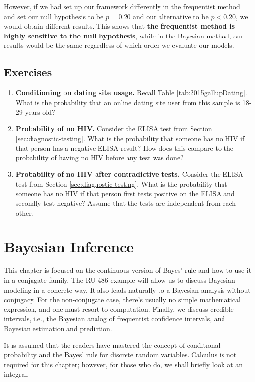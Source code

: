\documentclass[]{book}
\theoremstyle{definition}
\theoremstyle{definition}
\theoremstyle{definition}
\theoremstyle{remark}
\begin{document}
However, if we had set up our framework differently in the frequentist
method and set our null hypothesis to be \(p = 0.20\) and our
alternative to be \(p < 0.20\), we would obtain different results. This
shows that \textbf{the frequentist method is highly sensitive to the
null hypothesis}, while in the Bayesian method, our results would be the
same regardless of which order we evaluate our models.

\section{Exercises}\label{exercises}

\begin{enumerate}
\def\labelenumi{\arabic{enumi}.}
\item
  \textbf{Conditioning on dating site usage.} Recall Table
  \ref{tab:2015gallupDating}. What is the probability that an online
  dating site user from this sample is 18-29 years old?
\item
  \textbf{Probability of no HIV.} Consider the ELISA test from Section
  \ref{sec:diagnostic-testing}. What is the probability that someone has
  no HIV if that person has a negative ELISA result? How does this
  compare to the probability of having no HIV before any test was done?
\item
  \textbf{Probability of no HIV after contradictive tests.} Consider the
  ELISA test from Section \ref{sec:diagnostic-testing}. What is the
  probability that someone has no HIV if that person first tests
  positive on the ELISA and secondly test negative? Assume that the
  tests are independent from each other.
\end{enumerate}

\chapter{Bayesian Inference}\label{bayesian-inference}

This chapter is focused on the continuous version of Bayes' rule and how
to use it in a conjugate family. The RU-486 example will allow us to
discuss Bayesian modeling in a concrete way. It also leads naturally to
a Bayesian analysis without conjugacy. For the non-conjugate case,
there's usually no simple mathematical expression, and one must resort
to computation. Finally, we discuss credible intervals, i.e., the
Bayesian analog of frequentist confidence intervals, and Bayesian
estimation and prediction.

It is assumed that the readers have mastered the concept of conditional
probability and the Bayes' rule for discrete random variables. Calculus
is not required for this chapter; however, for those who do, we shall
briefly look at an integral.
\end{document}

